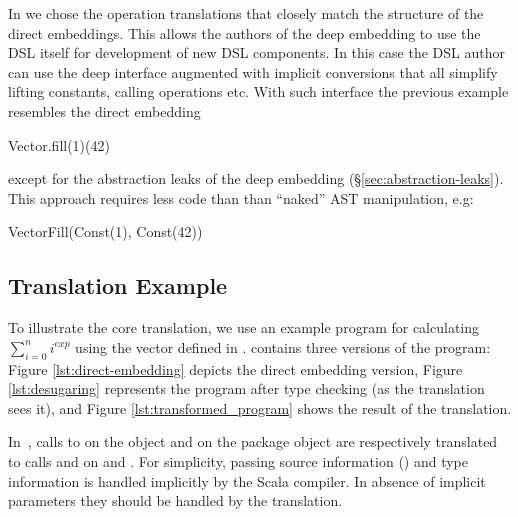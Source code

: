 In \yy we chose the operation translations that closely match the structure of
 the direct embeddings. This allows the authors of the deep embedding to use the
 DSL itself for development of new DSL components. In this case the DSL author can use
 the deep interface augmented with implicit conversions that all simplify lifting constants,
 calling operations etc. With such interface the previous example resembles the direct embedding\begin{lstparagraph}
Vector.fill(1)(42)
\end{lstparagraph}
except for the abstraction leaks of the deep embedding (\S \ref{sec:abstraction-leaks}).
This approach requires less code than than ``naked'' AST manipulation, e.g:\begin{lstparagraph}
VectorFill(Const(1), Const(42))
\end{lstparagraph}


\subsection{Translation Example}
\label{sec:translation-example}

To illustrate the core translation, we use an example program for calculating $\sum_{i=0}^n i^{exp}$ using the vector \edsl defined in .  contains three versions of the program: Figure \ref{lst:direct-embedding} depicts the direct embedding version, Figure \ref{lst:desugaring} represents the program after type checking (as the translation sees it), and Figure \ref{lst:transformed_program} shows the result of the translation.

 In~, calls to  on the object
  and  on the package object 
 are respectively translated to calls  and  on
  and . For simplicity, passing source
 information () and type information  is
 handled implicitly by the Scala compiler. In absence of implicit parameters
 they should be handled by the translation.

